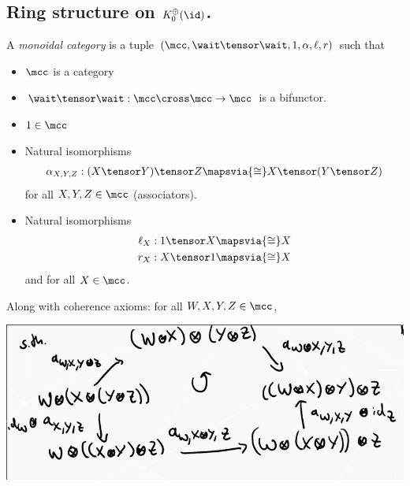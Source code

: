 \hypertarget{ring-structure-on-k_0oplusid.}{%
\subsection{\texorpdfstring{Ring structure on
\(K_0^\oplus(\id)\).}{Ring structure on K\_0\^{}\textbackslash oplus(\textbackslash id).}}\label{ring-structure-on-k_0oplusid.}}

\begin{definition}

A \emph{monoidal category} is a tuple
\((\mcc, \wait \tensor \wait, 1, \alpha, \ell, r)\) such that

\begin{itemize}
\tightlist
\item
  \(\mcc\) is a category
\item
  \(\wait \tensor \wait: \mcc \cross \mcc \to \mcc\) is a bifunctor.
\item
  \(1\in \mcc\)
\item
  Natural isomorphisms
  \begin{align*}
  \alpha_{X,Y,Z}: (X\tensor Y)\tensor Z \mapsvia{\cong} X\tensor (Y\tensor Z)
  \end{align*} for all \(X,Y,Z\in \mcc\) (associators).
\item
  Natural isomorphisms
  \begin{align*}
  \ell_X: 1\tensor X &\mapsvia{\cong} X\\
  r_X:X\tensor 1 &\mapsvia{\cong}X
  \end{align*} and for all \(X\in \mcc\).
\end{itemize}

Along with coherence axioms: for all \(W,X,Y,Z\in \mcc\),

\includegraphics{figures/image_2020-07-13-11-09-53.png}

\begin{center}\end{center}

\end{definition}

